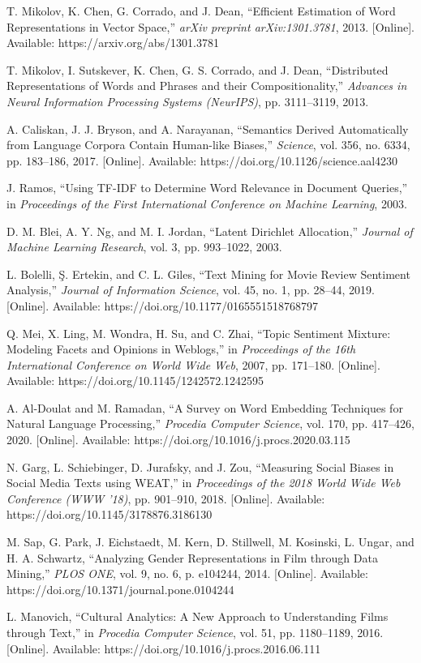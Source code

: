 \documentclass[conference]{IEEEtran}
\begin{document}
\begin{thebibliography}{00}

 T. Mikolov, K. Chen, G. Corrado, and J. Dean, ``Efficient Estimation of Word Representations in Vector Space,'' \textit{arXiv preprint arXiv:1301.3781}, 2013. [Online]. Available: https://arxiv.org/abs/1301.3781

 T. Mikolov, I. Sutskever, K. Chen, G. S. Corrado, and J. Dean, ``Distributed Representations of Words and Phrases and their Compositionality,'' \textit{Advances in Neural Information Processing Systems (NeurIPS)}, pp. 3111--3119, 2013.

 A. Caliskan, J. J. Bryson, and A. Narayanan, ``Semantics Derived Automatically from Language Corpora Contain Human-like Biases,'' \textit{Science}, vol. 356, no. 6334, pp. 183--186, 2017. [Online]. Available: https://doi.org/10.1126/science.aal4230

 J. Ramos, ``Using TF-IDF to Determine Word Relevance in Document Queries,'' in \textit{Proceedings of the First International Conference on Machine Learning}, 2003.

 D. M. Blei, A. Y. Ng, and M. I. Jordan, ``Latent Dirichlet Allocation,'' \textit{Journal of Machine Learning Research}, vol. 3, pp. 993--1022, 2003.

 L. Bolelli, Ş. Ertekin, and C. L. Giles, ``Text Mining for Movie Review Sentiment Analysis,'' \textit{Journal of Information Science}, vol. 45, no. 1, pp. 28--44, 2019. [Online]. Available: https://doi.org/10.1177/0165551518768797

 Q. Mei, X. Ling, M. Wondra, H. Su, and C. Zhai, ``Topic Sentiment Mixture: Modeling Facets and Opinions in Weblogs,'' in \textit{Proceedings of the 16th International Conference on World Wide Web}, 2007, pp. 171--180. [Online]. Available: https://doi.org/10.1145/1242572.1242595

 A. Al-Doulat and M. Ramadan, ``A Survey on Word Embedding Techniques for Natural Language Processing,'' \textit{Procedia Computer Science}, vol. 170, pp. 417--426, 2020. [Online]. Available: https://doi.org/10.1016/j.procs.2020.03.115

 N. Garg, L. Schiebinger, D. Jurafsky, and J. Zou, ``Measuring Social Biases in Social Media Texts using WEAT,'' in \textit{Proceedings of the 2018 World Wide Web Conference (WWW '18)}, pp. 901--910, 2018. [Online]. Available: https://doi.org/10.1145/3178876.3186130

 M. Sap, G. Park, J. Eichstaedt, M. Kern, D. Stillwell, M. Kosinski, L. Ungar, and H. A. Schwartz, ``Analyzing Gender Representations in Film through Data Mining,'' \textit{PLOS ONE}, vol. 9, no. 6, p. e104244, 2014. [Online]. Available: https://doi.org/10.1371/journal.pone.0104244

 L. Manovich, ``Cultural Analytics: A New Approach to Understanding Films through Text,'' in \textit{Procedia Computer Science}, vol. 51, pp. 1180--1189, 2016. [Online]. Available: https://doi.org/10.1016/j.procs.2016.06.111

\end{thebibliography}
\vspace{12pt}
\end{document}
